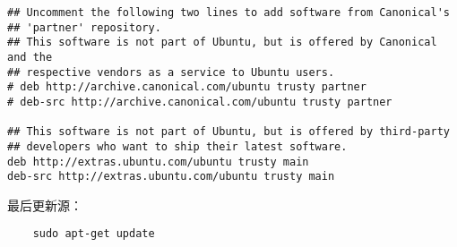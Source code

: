 \documentclass[a4paper,left=2.5cm,right=2.5cm,11pt]{article}
\begin{document}
\begin{lstlisting}
## Uncomment the following two lines to add software from Canonical's
## 'partner' repository.
## This software is not part of Ubuntu, but is offered by Canonical and the
## respective vendors as a service to Ubuntu users.
# deb http://archive.canonical.com/ubuntu trusty partner
# deb-src http://archive.canonical.com/ubuntu trusty partner

## This software is not part of Ubuntu, but is offered by third-party
## developers who want to ship their latest software.
deb http://extras.ubuntu.com/ubuntu trusty main
deb-src http://extras.ubuntu.com/ubuntu trusty main
	\end{lstlisting}

	最后更新源：
	\begin{lstlisting}
	sudo apt-get update
	\end{lstlisting}
\end{document}
